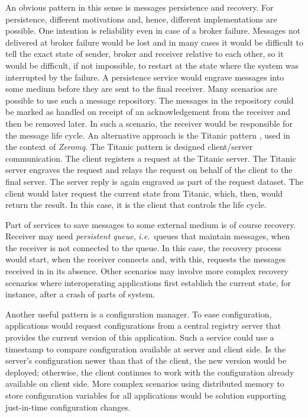 \documentclass[a4paper]{scrartcl}
\newcommand\ie{\textit{i.e.}}
\newcommand{\term}[1]{\emph{#1}}
\begin{document}
An obvious pattern in this sense is
messages persistence and recovery.
For persistence, different motivations and, hence,
different implementations are possible.
One intention is reliability even in case
of a broker failure.
Messages not delivered at broker failure
would be lost and in many cases it would be difficult
to tell the exact state of sender, broker and receiver
relative to each other, so it would be difficult,
if not impossible, to restart at the state
where the system was interrupted by the failure.
A persistence service
would engrave messages into some medium
before they are sent to the final receiver.
Many scenarios are possible to use such 
a message repository.
The messages in the repository could 
be marked as handled
on receipt of an acknowledgement from the receiver
and then be removed later.
In such a scenario, the receiver would be responsible
for the message life cycle.
An alternative approach is the Titanic pattern \cite{cc13, titanic},
used in the context of \term{Zeromq}.
The Titanic pattern is designed client/server communication.
The client registers a request at the Titanic server.
The Titanic server engraves the request
and relays the request on behalf of the client
to the final server.
The server reply is again engraved as part
of the request dataset.
The client would later request the current state
from Titanic, which, then, would return the result.
In this case, it is the client that controls
the life cycle.

Part of services to save messages to some external medium
is of course recovery.
Receiver may need \term{persistent queue},
\ie\ queues that maintain messages,
when the receiver is not connected to the queue.
In this case, the recovery process would start,
when the receiver connects and, with this, 
requests the messages received in in its absence.
Other scenarios may involve more complex recovery
scenarios where interoperating applications 
first establish the current state, for instance,
after a crash of parts of system.

Another useful pattern is a configuration manager.
To ease configuration, applications would request
configurations from a central registry server
that provides the current version of this application.
Such a service could use a timestamp to compare
configuration available at server and client side.
Is the server's configuration newer than that of the client,
the new version would be deployed;
otherwise, the client continues to work with the configuration
already available on client side.
More complex scenarios using distributed memory to store
configuration variables for all applications would 
be solution supporting just-in-time configuration changes.
\end{document}
